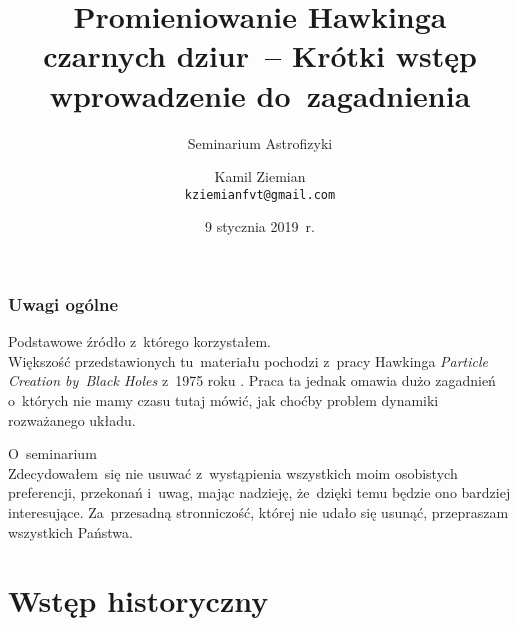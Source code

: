 \documentclass[10pt,t]{beamer}
\title[Promieniowanie Hawkinga]{Promieniowanie Hawkinga czarnych
  dziur~-- Krótki wstęp wprowadzenie do~zagadnienia}
\subtitle{Seminarium Astrofizyki}
\author{Kamil Ziemian \\
  \texttt{kziemianfvt@gmail.com} }
\institute{Zakład Teorii Pola, \\
  Uniwersytet Jagielloński w~Krakowie}
\date[9 stycznia 2019~r.]{9 stycznia 2019~r.}
\begin{document}






\RaggedRight





\maketitle %










\begin{frame}
  \frametitle{Uwagi ogólne}


  Podstawowe źródło z~którego korzystałem. \\
  Większość przedstawionych tu~materiału pochodzi z~pracy Hawkinga
  \textit{Particle Creation by~Black Holes} z~1975 roku
  \cite{HawkingParticleCreationByBlackHole1975}. Praca ta jednak
  omawia dużo zagadnień o~których nie mamy czasu tutaj mówić, jak
  choćby problem dynamiki rozważanego układu.

  O~seminarium \\
  Zdecydowałem~się nie usuwać z~wystąpienia wszystkich moim
  osobistych preferencji, przekonań i~uwag, mając nadzieję,
  że~dzięki temu będzie ono bardziej interesujące.
  Za~przesadną stronniczość, której nie udało się usunąć,
  przepraszam wszystkich Państwa.

\end{frame}










\section{Wstęp historyczny}
\end{document}
